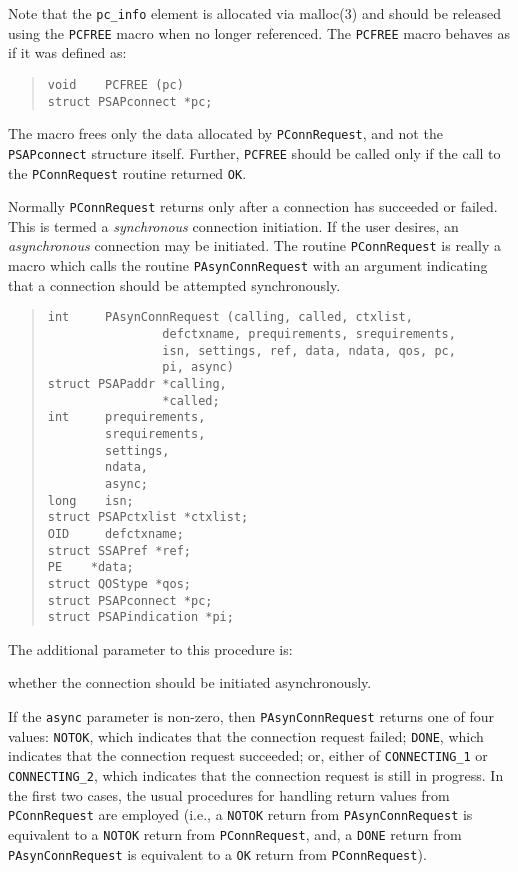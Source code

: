 Note that the \verb"pc_info" element is allocated via \man malloc(3) and
should be released using the \verb"PCFREE" macro when no longer referenced.
The \verb"PCFREE" macro behaves as if it was defined as:
\begin{quote}\small\begin{verbatim}
void    PCFREE (pc)
struct PSAPconnect *pc;
\end{verbatim}\end{quote}
The macro frees only the data allocated by \verb"PConnRequest",
and not the \verb"PSAPconnect" structure itself.
Further,
\verb"PCFREE" should be called only if the call to the \verb"PConnRequest"
routine returned \verb"OK".

Normally \verb"PConnRequest" returns only after a connection has succeeded or
failed.
This is termed a {\em synchronous\/} connection initiation.
If the user desires, an {\em asynchronous\/} connection may be initiated.
The routine \verb"PConnRequest" is really a macro which calls the routine
\verb"PAsynConnRequest" with an argument indicating that a connection should
be attempted synchronously.
\begin{quote}\small\begin{verbatim}
int     PAsynConnRequest (calling, called, ctxlist,
                defctxname, prequirements, srequirements,
                isn, settings, ref, data, ndata, qos, pc,
                pi, async)
struct PSAPaddr *calling,
                *called;
int     prequirements,
        srequirements,
        settings,
        ndata,
        async;
long	isn;
struct PSAPctxlist *ctxlist;
OID     defctxname;
struct SSAPref *ref;
PE    *data;
struct QOStype *qos;
struct PSAPconnect *pc;
struct PSAPindication *pi;
\end{verbatim}\end{quote}
The additional parameter to this procedure is:
\begin{describe}
\item[\verb"async":] whether the connection should be initiated asynchronously.
\end{describe}
If the \verb"async" parameter is non-zero,
then \verb"PAsynConnRequest" returns one of four values:
\verb"NOTOK", which indicates that the connection request failed;
\verb"DONE", which indicates that the connection request succeeded;
or, either of \verb"CONNECTING_1" or \verb"CONNECTING_2", which indicates that
the connection request is still in
progress.
In the first two cases,
the usual procedures for handling return values from \verb"PConnRequest" are
employed
(i.e., a \verb"NOTOK" return from \verb"PAsynConnRequest" is equivalent to a
\verb"NOTOK" return from \verb"PConnRequest", and,
a \verb"DONE" return from \verb"PAsynConnRequest" is equivalent to a
\verb"OK" return from \verb"PConnRequest").

